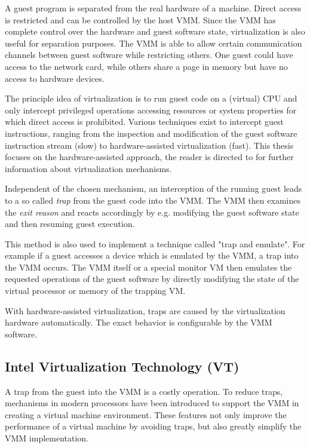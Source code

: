 A guest program is separated from the real hardware of a machine. Direct access
is restricted and can be controlled by the host VMM. Since the VMM has complete
control over the hardware and guest software state, virtualization is also
useful for separation purposes. The VMM is able to allow certain communication
channels between guest software while restricting others. One guest could have
access to the network card, while others share a page in memory but have no
access to hardware devices.

The principle idea of virtualization is to run guest code on a (virtual) CPU
and only intercept privileged operations accessing resources or system
properties for which direct access is prohibited. Various techniques exist to
intercept guest instructions, ranging from the inspection and modification of
the guest software instruction stream (slow) to hardware-assisted
virtualization (fast). This thesis focuses on the hardware-assisted approach,
the reader is directed to \cite{VMware:virtualization} for further information
about virtualization mechanisms.

Independent of the chosen mechanism, an interception of the running guest leads
to a so called \emph{trap} from the guest code into the VMM. The
VMM then examines the \emph{exit reason} and reacts accordingly by e.g.
modifying the guest software state and then resuming guest execution.

This method is also used to implement a technique called "trap and emulate".
For example if a guest accesses a device which is emulated by the VMM, a trap
into the VMM occurs. The VMM itself or a special monitor VM then emulates the
requested operations of the guest software by directly modifying the state of
the virtual processor or memory of the trapping VM.

With hardware-assisted virtualization, traps are caused by the virtualization
hardware automatically. The exact behavior is configurable by the VMM software.

\subsection{Intel Virtualization Technology (VT)}
A trap from the guest into the VMM is a costly operation. To reduce traps,
mechanisms in modern processors have been introduced to support the VMM in
creating a virtual machine environment. These features not only improve the
performance of a virtual machine by avoiding traps, but also greatly simplify
the VMM implementation.

